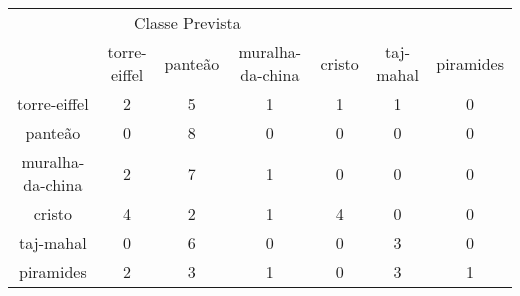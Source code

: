 \begin{tabular}{|c|c|c|c|c|c|c|}
\hline
\multicolumn{5}{|c|}{Classe Prevista}\\
 & torre-eiffel & panteão & muralha-da-china & cristo & taj-mahal & piramides\\
torre-eiffel & 2 & 5 & 1 & 1 & 1 & 0\\
panteão & 0 & 8 & 0 & 0 & 0 & 0\\
muralha-da-china & 2 & 7 & 1 & 0 & 0 & 0\\
cristo & 4 & 2 & 1 & 4 & 0 & 0\\
taj-mahal & 0 & 6 & 0 & 0 & 3 & 0\\
piramides & 2 & 3 & 1 & 0 & 3 & 1\\
\end{tabular}
